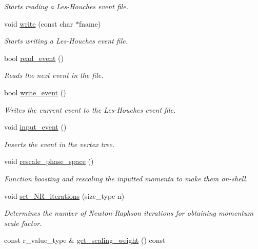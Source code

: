 \begin{DoxyCompactItemize}
\begin{DoxyCompactList}\small\item\em Starts reading a Les-\/\+Houches event file. \end{DoxyCompactList}\item 
\hypertarget{a00326_aabf04004e59b40bbc1df35d85dc177f4}{}void \hyperlink{a00326_aabf04004e59b40bbc1df35d85dc177f4}{write} (const char $\ast$fname)\label{a00326_aabf04004e59b40bbc1df35d85dc177f4}

\begin{DoxyCompactList}\small\item\em Starts writing a Les-\/\+Houches event file. \end{DoxyCompactList}\item 
bool \hyperlink{a00326_a5ab609c33cbbf9095f67903f84a6af96}{read\+\_\+event} ()
\begin{DoxyCompactList}\small\item\em Reads the next event in the file. \end{DoxyCompactList}\item 
bool \hyperlink{a00326_afa0fa10eaaae4381a48909c00cbdb767}{write\+\_\+event} ()
\begin{DoxyCompactList}\small\item\em Writes the current event to the Les-\/\+Houches event file. \end{DoxyCompactList}\item 
void \hyperlink{a00326_a96712f08c069ed72d2de8364fb740dee}{input\+\_\+event} ()
\begin{DoxyCompactList}\small\item\em Inserts the event in the vertex tree. \end{DoxyCompactList}\item 
void \hyperlink{a00326_a736d8187bd61e9136a65c6907ec0dfd1}{rescale\+\_\+phase\+\_\+space} ()
\begin{DoxyCompactList}\small\item\em Function boosting and rescaling the inputted momenta to make them on-\/shell. \end{DoxyCompactList}\item 
\hypertarget{a00326_a628289bd16fc63e510edea398ea97774}{}void \hyperlink{a00326_a628289bd16fc63e510edea398ea97774}{set\+\_\+\+N\+R\+\_\+iterations} (size\+\_\+type n)\label{a00326_a628289bd16fc63e510edea398ea97774}

\begin{DoxyCompactList}\small\item\em Determines the number of Newton-\/\+Raphson iterations for obtaining momentum scale factor. \end{DoxyCompactList}\item 
\hypertarget{a00326_a02877f2ccb7860e06d2caa77afec4015}{}const r\+\_\+value\+\_\+type \& \hyperlink{a00326_a02877f2ccb7860e06d2caa77afec4015}{get\+\_\+scaling\+\_\+weight} () const \label{a00326_a02877f2ccb7860e06d2caa77afec4015}


\end{DoxyCompactItemize}
